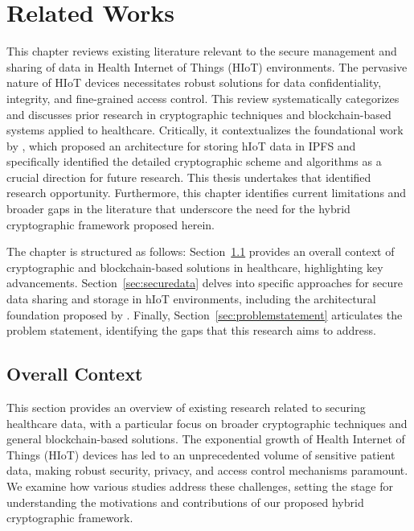 \documentclass[cic,tc,english]{iiufrgs}
\begin{document}
\chapter{Related Works}
    \label{chap:relatedworks}

    This chapter reviews existing literature relevant to the secure management and sharing of data in Health Internet of Things (HIoT) environments. The pervasive nature of HIoT devices necessitates robust solutions for data confidentiality, integrity, and fine-grained access control. This review systematically categorizes and discusses prior research in cryptographic techniques and blockchain-based systems applied to healthcare. Critically, it contextualizes the foundational work by \citet{laura2023}, which proposed an architecture for storing hIoT data in IPFS and specifically identified the detailed cryptographic scheme and algorithms as a crucial direction for future research. This thesis undertakes that identified research opportunity. Furthermore, this chapter identifies current limitations and broader gaps in the literature that underscore the need for the hybrid cryptographic framework proposed herein.

    The chapter is structured as follows: Section~\ref{sec:overallcontext} provides an overall context of cryptographic and blockchain-based solutions in healthcare, highlighting key advancements. Section~\ref{sec:securedata} delves into specific approaches for secure data sharing and storage in hIoT environments, including the architectural foundation proposed by \citet{laura2023}. Finally, Section~\ref{sec:problemstatement} articulates the problem statement, identifying the gaps that this research aims to address.

    \section{Overall Context}
    \label{sec:overallcontext}

        This section provides an overview of existing research related to securing healthcare data, with a particular focus on broader cryptographic techniques and general blockchain-based solutions. The exponential growth of Health Internet of Things (HIoT) devices has led to an unprecedented volume of sensitive patient data, making robust security, privacy, and access control mechanisms paramount. We examine how various studies address these challenges, setting the stage for understanding the motivations and contributions of our proposed hybrid cryptographic framework.
\end{document}
